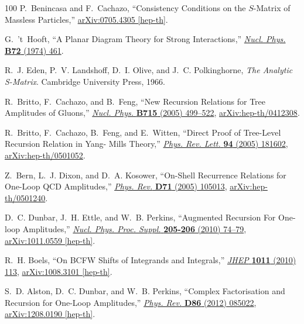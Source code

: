 \documentclass[12pt,hyperref,compress]{JHEP3}
\begin{document}
\begin{thebibliography}{100}
P.~Benincasa and F.~Cachazo, ``{Consistency Conditions on the $S$-Matrix of
  Massless Particles},''
\href{http://arxiv.org/abs/0705.4305}{{ arXiv:0705.4305 [hep-th]}}.

G.~'t~Hooft, ``{A Planar Diagram Theory for Strong Interactions},''
\href{http://dx.doi.org/10.1016/0550-3213(74)90154-0}{{\em Nucl. Phys.} {\bf
  B72} (1974)  461}.

R.~J. Eden, P.~V. Landshoff, D.~I. Olive, and J.~C. Polkinghorne, {\em The
  Analytic S-Matrix}.
\newblock Cambridge University Press, 1966.

R.~Britto, F.~Cachazo, and B.~Feng, ``{New Recursion Relations for Tree
  Amplitudes of Gluons},''
  \href{http://dx.doi.org/10.1016/j.nuclphysb.2005.02.030}{{\em Nucl. Phys.}
  {\bf B715} (2005)  499--522},
\href{http://arxiv.org/abs/hep-th/0412308}{{ arXiv:hep-th/0412308}}.

R.~Britto, F.~Cachazo, B.~Feng, and E.~Witten, ``{Direct Proof of Tree-Level
  Recursion Relation in Yang- Mills Theory},''
  \href{http://dx.doi.org/10.1103/PhysRevLett.94.181602}{{\em Phys. Rev. Lett.}
  {\bf 94} (2005)  181602},
\href{http://arxiv.org/abs/hep-th/0501052}{{ arXiv:hep-th/0501052}}.

Z.~Bern, L.~J. Dixon, and D.~A. Kosower, ``{On-Shell Recurrence Relations for
  One-Loop QCD Amplitudes},''
  \href{http://dx.doi.org/10.1103/PhysRevD.71.105013}{{\em Phys. Rev.} {\bf
  D71} (2005)  105013},
\href{http://arxiv.org/abs/hep-th/0501240}{{ arXiv:hep-th/0501240}}.

D.~C. Dunbar, J.~H. Ettle, and W.~B. Perkins, ``{Augmented Recursion For
  One-loop Amplitudes},''
  \href{http://dx.doi.org/10.1016/j.nuclphysbps.2010.08.022}{{\em Nucl. Phys.
  Proc. Suppl.} {\bf 205-206} (2010)  74--79},
\href{http://arxiv.org/abs/1011.0559}{{ arXiv:1011.0559 [hep-th]}}.

R.~H. Boels, ``{On BCFW Shifts of Integrands and Integrals},''
  \href{http://dx.doi.org/10.1007/JHEP11(2010)113}{{\em JHEP} {\bf 1011} (2010)
   113},
\href{http://arxiv.org/abs/1008.3101}{{ arXiv:1008.3101 [hep-th]}}.

S.~D. Alston, D.~C. Dunbar, and W.~B. Perkins, ``{Complex Factorisation and
  Recursion for One-Loop Amplitudes},''
  \href{http://dx.doi.org/10.1103/PhysRevD.86.085022}{{\em Phys. Rev.} {\bf
  D86} (2012)  085022},
\href{http://arxiv.org/abs/1208.0190}{{ arXiv:1208.0190 [hep-th]}}.


\end{thebibliography}
\end{document}
